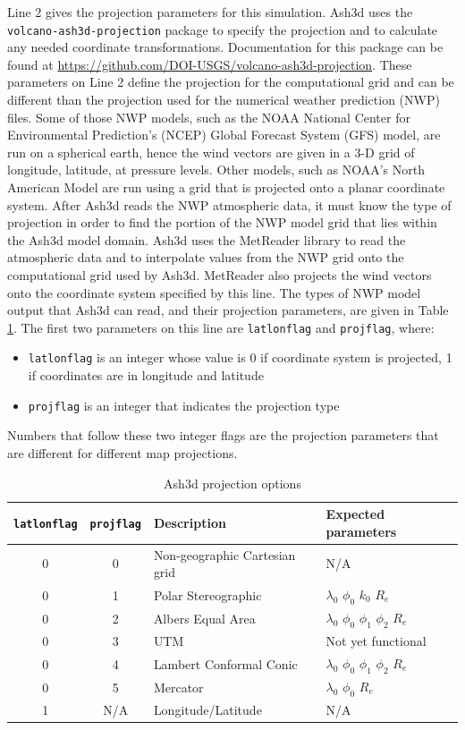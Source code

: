 Line 2 gives the projection parameters for this simulation.
Ash3d uses the \texttt{volcano-ash3d-projection} package to specify the
projection and to calculate any needed coordinate transformations.
Documentation for this package can be found at
\url{https://github.com/DOI-USGS/volcano-ash3d-projection}.
These parameters on Line 2 define the projection for the computational
grid and can be different than the projection used for the numerical
weather prediction (NWP) files. Some of
those NWP models, such as the NOAA National Center for Environmental
Prediction’s (NCEP) Global Forecast System (GFS) model, are run
on a spherical earth, hence the wind vectors are given in a 3-D
grid of longitude, latitude, at pressure levels. Other models, such
as NOAA’s North American Model are run using a grid that is
projected onto a planar coordinate system. After Ash3d reads
the NWP atmospheric data, it must know the type of projection in order
to find the portion of the NWP model grid that lies within the
Ash3d model domain.
Ash3d uses the MetReader library to read the atmospheric data and to
interpolate values from the NWP grid onto the computational grid used
by Ash3d. MetReader also projects the wind vectors onto the coordinate
system specified by this line.
The types of NWP model output that
Ash3d can read, and their projection parameters, are given in
Table \ref{tab:ProjOpt}.
The first two parameters on this line are \texttt{latlonflag} and
\texttt{projflag},
where:
\begin{itemize}
 \item \texttt{latlonflag} is an integer whose value is 0 if coordinate system is
projected, 1 if coordinates are in longitude and latitude
 \item \texttt{projflag} is an integer that indicates the projection type
\end{itemize}
Numbers that follow these two integer flags are the projection parameters
that are different for different map projections.
\small
\begin{table}[htbp]
\begin{center}
\begin{tabular}{| c | c | l | l |}
\hline
\texttt{latlonflag} & \texttt{projflag} & Description & Expected parameters\\
\hline
0 & 0 & Non-geographic Cartesian grid & N/A \\
0 & 1 & Polar Stereographic & $\lambda_0$ $\phi_0$ $k_0$ $R_e$ \\
0 & 2 & Albers Equal Area & $\lambda_0$ $\phi_0$ $\phi_1$ $\phi_2$ $R_e$ \\
0 & 3 & UTM & Not yet functional \\
0 & 4 & Lambert Conformal Conic & $\lambda_0$ $\phi_0$ $\phi_1$ $\phi_2$ $R_e$\\
0 & 5 & Mercator & $\lambda_0$ $\phi_0$ $R_e$\\
1 & N/A & Longitude/Latitude & N/A \\
\hline
\end{tabular}
\caption{\label{tab:ProjOpt}Ash3d projection options}
\end{center}
\end{table}
